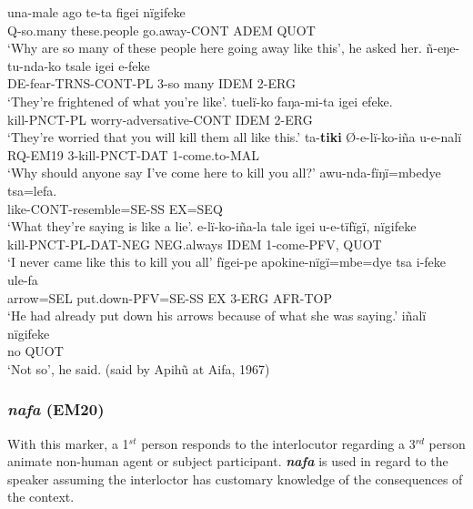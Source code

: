 \documentclass[output=paper]{langsci/langscibook}
\begin{document}
\begin{exe}
\ex \label{ex:eb45}
	\begin{xlist}
	\ex \label{ex:eb45a}
	\gll una-male ago te-ta figei nïgifeke\\
	Q-so.many these.people go.away-CONT ADEM QUOT\\
	\trans ‘Why are so many of these people here going away like this’, he asked her.
	\ex \label{ex:eb45b}
	\gll ñ-eŋe-tu-nda-ko tsale igei e-feke\\
	DE-fear-TRNS-CONT-PL 3-so many IDEM 2-ERG\\
	\trans ‘They’re frightened of what you’re like’.
	\ex\label{ex:eb45c}
	\gll tuelï-ko faŋa-mi-ta igei efeke.\\
	kill-PNCT-PL worry-adversative-CONT IDEM 2-ERG\\
	\trans ‘They’re worried that you will kill them all like this.’  
	\ex \label{ex:eb45d}
	\gll ta-\textbf{tiki} Ø-e-lï-ko-iña u-e-nalï\\
	RQ-EM19 3-kill-PNCT-DAT 1-come.to-MAL\\
	\trans ‘Why should anyone say I’ve come here to kill you all?’
	\ex \label{ex:eb45e}
	\gll awu-nda-fïŋï=mbedye tsa=lefa.\\
	like-CONT-resemble=SE-SS EX=SEQ\\
	\trans ‘What they’re saying is like a lie’. 
	\ex \label{ex:eb45f}
	\gll e-lï-ko-iña-la tale igei u-e-tïfïgï, nïgifeke\\
	kill-PNCT-PL-DAT-NEG NEG.always IDEM 1-come-PFV, QUOT\\
	\trans ‘I never came like this to kill you all’
	\ex \label{ex:eb45g}
	\gll fïgei-pe apokine-nïgï=mbe=dye tsa i-feke ule-fa\\
	arrow=SEL put.down-PFV=SE-SS EX 3-ERG AFR-TOP\\
	\trans ‘He had already put down his arrows because of what she was saying.’
	\ex \label{ex:eb45h}
	\gll iñalï nïgifeke\\
	no QUOT\\
	\trans ‘Not so’, he said. (said by Apihũ at Aifa, 1967)
\end{xlist}
\end{exe}

\subsubsection{\textit{nafa} (EM20)} 
With this marker, a 1$^{st}$ person responds to the interlocutor regarding  a 3$^{rd}$ person animate non-human agent or subject participant.   \textbf{\textit{nafa}} is used in regard to the speaker  assuming the interloctor has customary knowledge of the consequences of the context. 
\end{document}
